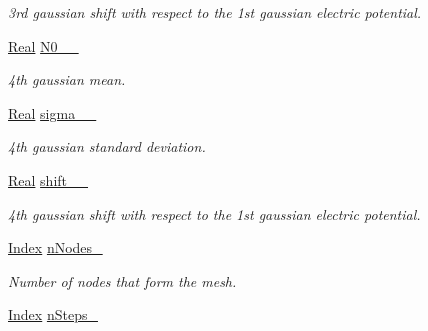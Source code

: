 \begin{DoxyCompactItemize}
\begin{DoxyCompactList}\small\item\em 3rd gaussian shift with respect to the 1st gaussian electric potential. \end{DoxyCompactList}\item 
\hypertarget{classParamList_aa65785f19373f13b7b3a5ef53480f3bb}{\hyperlink{typedefs_8h_a060b837c3b4486ee35317744156f3da2}{Real} \hyperlink{classParamList_aa65785f19373f13b7b3a5ef53480f3bb}{N0\-\_\-\_\-}}\label{classParamList_aa65785f19373f13b7b3a5ef53480f3bb}

\begin{DoxyCompactList}\small\item\em 4th gaussian mean. \end{DoxyCompactList}\item 
\hypertarget{classParamList_ae484eb848d5c0716145e00c974ebecca}{\hyperlink{typedefs_8h_a060b837c3b4486ee35317744156f3da2}{Real} \hyperlink{classParamList_ae484eb848d5c0716145e00c974ebecca}{sigma\-\_\-\_\-}}\label{classParamList_ae484eb848d5c0716145e00c974ebecca}

\begin{DoxyCompactList}\small\item\em 4th gaussian standard deviation. \end{DoxyCompactList}\item 
\hypertarget{classParamList_a52a824700b094c4d0d908e052989931d}{\hyperlink{typedefs_8h_a060b837c3b4486ee35317744156f3da2}{Real} \hyperlink{classParamList_a52a824700b094c4d0d908e052989931d}{shift\-\_\-\_\-}}\label{classParamList_a52a824700b094c4d0d908e052989931d}

\begin{DoxyCompactList}\small\item\em 4th gaussian shift with respect to the 1st gaussian electric potential. \end{DoxyCompactList}\item 
\hypertarget{classParamList_a574676917a0d7d70140f4ed29bb1e8b4}{\hyperlink{typedefs_8h_a2c726f8f32697958e9d6c2afecda531d}{Index} \hyperlink{classParamList_a574676917a0d7d70140f4ed29bb1e8b4}{n\-Nodes\-\_\-}}\label{classParamList_a574676917a0d7d70140f4ed29bb1e8b4}

\begin{DoxyCompactList}\small\item\em Number of nodes that form the mesh. \end{DoxyCompactList}\item 
\hypertarget{classParamList_a78ebf0df2418a1d19ac405bc86edee1e}{\hyperlink{typedefs_8h_a2c726f8f32697958e9d6c2afecda531d}{Index} \hyperlink{classParamList_a78ebf0df2418a1d19ac405bc86edee1e}{n\-Steps\-\_\-}}\label{classParamList_a78ebf0df2418a1d19ac405bc86edee1e}


\end{DoxyCompactItemize}
